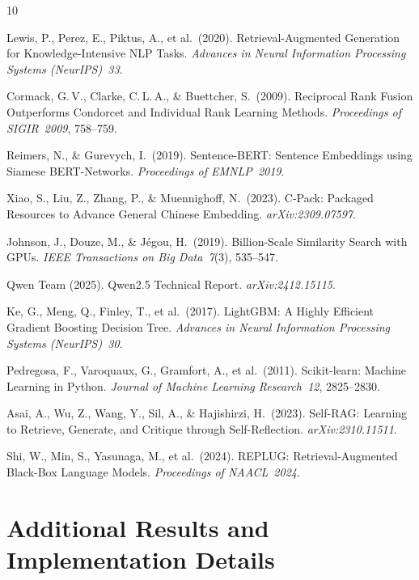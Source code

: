 \documentclass{article}
\begin{document}
\begin{thebibliography}{10}

Lewis, P., Perez, E., Piktus, A., et al.\ (2020).
Retrieval-Augmented Generation for Knowledge-Intensive NLP Tasks.
\textit{Advances in Neural Information Processing Systems (NeurIPS)~33}.

Cormack, G.\,V., Clarke, C.\,L.\,A., \& Buettcher, S.\ (2009).
Reciprocal Rank Fusion Outperforms Condorcet and Individual Rank Learning Methods.
\textit{Proceedings of SIGIR~2009}, 758--759.

Reimers, N., \& Gurevych, I.\ (2019).
Sentence-BERT: Sentence Embeddings using Siamese BERT-Networks.
\textit{Proceedings of EMNLP~2019}.

Xiao, S., Liu, Z., Zhang, P., \& Muennighoff, N.\ (2023).
C-Pack: Packaged Resources to Advance General Chinese Embedding.
\textit{arXiv:2309.07597}.

Johnson, J., Douze, M., \& J\'{e}gou, H.\ (2019).
Billion-Scale Similarity Search with GPUs.
\textit{IEEE Transactions on Big Data~7}(3), 535--547.

Qwen Team (2025).
Qwen2.5 Technical Report.
\textit{arXiv:2412.15115}.

Ke, G., Meng, Q., Finley, T., et al.\ (2017).
LightGBM: A Highly Efficient Gradient Boosting Decision Tree.
\textit{Advances in Neural Information Processing Systems (NeurIPS)~30}.

Pedregosa, F., Varoquaux, G., Gramfort, A., et al.\ (2011).
Scikit-learn: Machine Learning in Python.
\textit{Journal of Machine Learning Research~12}, 2825--2830.

Asai, A., Wu, Z., Wang, Y., Sil, A., \& Hajishirzi, H.\ (2023).
Self-RAG: Learning to Retrieve, Generate, and Critique through Self-Reflection.
\textit{arXiv:2310.11511}.

Shi, W., Min, S., Yasunaga, M., et al.\ (2024).
REPLUG: Retrieval-Augmented Black-Box Language Models.
\textit{Proceedings of NAACL~2024}.

\end{thebibliography}

\appendix

\section{Additional Results and Implementation Details}
\end{document}
